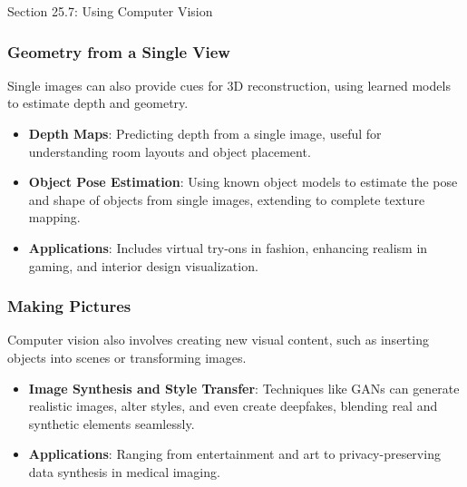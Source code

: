 \begin{notes}{Section 25.7: Using Computer Vision}
    \subsubsection*{Geometry from a Single View}
    
    Single images can also provide cues for 3D reconstruction, using learned models to estimate depth and geometry.
    
    \begin{highlight}
    
        \begin{itemize}
            \item \textbf{Depth Maps}: Predicting depth from a single image, useful for understanding room layouts and object placement.
            \item \textbf{Object Pose Estimation}: Using known object models to estimate the pose and shape of objects from single images, extending to complete texture mapping.
            \item \textbf{Applications}: Includes virtual try-ons in fashion, enhancing realism in gaming, and interior design visualization.
        \end{itemize}
    
    \end{highlight}
    
    \subsubsection*{Making Pictures}
    
    Computer vision also involves creating new visual content, such as inserting objects into scenes or transforming images.
    
    \begin{highlight}
    
        \begin{itemize}
            \item \textbf{Image Synthesis and Style Transfer}: Techniques like GANs can generate realistic images, alter styles, and even create deepfakes, blending real and synthetic elements seamlessly.
            \item \textbf{Applications}: Ranging from entertainment and art to privacy-preserving data synthesis in medical imaging.
        \end{itemize}
    
    \end{highlight}
    

\end{notes}
